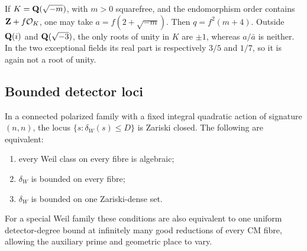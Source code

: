 \begin{remark}
If $K=\mathbf Q(\sqrt{-m})$, with $m>0$ squarefree, and the endomorphism order contains $\mathbf Z+f\mathcal O_K$, one may take $a=f(2+\sqrt{-m})$. Then $q=f^2(m+4)$. Outside $\mathbf Q(i)$ and $\mathbf Q(\sqrt{-3})$, the only roots of unity in $K$ are $\pm1$, whereas $a/\bar a$ is neither. In the two exceptional fields its real part is respectively $3/5$ and $1/7$, so it is again not a root of unity.
\end{remark}

\subsection{Bounded detector loci}

\begin{proposition}\label{prop:detector-loci}
In a connected polarized family with a fixed integral quadratic action of signature $(n,n)$, the locus $\{s:\delta_W(s)\leq D\}$ is Zariski closed. The following are equivalent:
\begin{enumerate}[label=\textnormal{(\roman*)}]
\item every Weil class on every fibre is algebraic;
\item $\delta_W$ is bounded on every fibre;
\item $\delta_W$ is bounded on one Zariski-dense set.
\end{enumerate}
For a special Weil family these conditions are also equivalent to one uniform detector-degree bound at infinitely many good reductions of every CM fibre, allowing the auxiliary prime and geometric place to vary.
\end{proposition}

